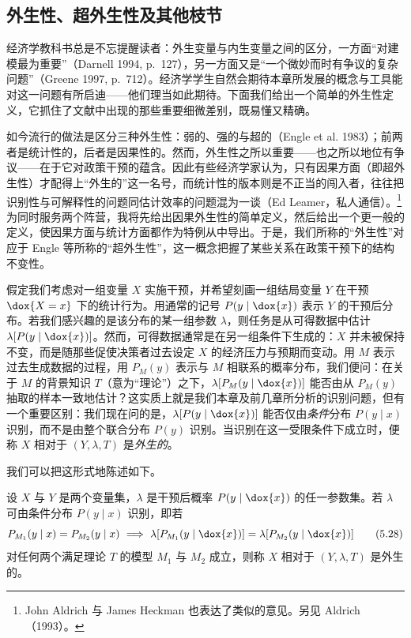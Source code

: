 \subsection{外生性、超外生性及其他枝节}

经济学教科书总是不忘提醒读者：外生变量与内生变量之间的区分，一方面“对建模最为重要”（Darnell 1994, p.~127），另一方面又是“一个微妙而时有争议的复杂问题”（Greene 1997, p.~712）。经济学学生自然会期待本章所发展的概念与工具能对这一问题有所启迪——他们理当如此期待。下面我们给出一个简单的外生性定义，它抓住了文献中出现的那些重要细微差别，既易懂又精确。

如今流行的做法是区分三种外生性：弱的、强的与超的（Engle et al. 1983）；前两者是统计性的，后者是因果性的。然而，外生性之所以重要——也之所以地位有争议——在于它对政策干预的蕴含。因此有些经济学家认为，只有因果方面（即超外生性）才配得上“外生的”这一名号，而统计性的版本则是不正当的闯入者，往往把识别性与可解释性的问题同估计效率的问题混为一谈（Ed Leamer，私人通信）。\footnote{John Aldrich 与 James Heckman 也表达了类似的意见。另见 Aldrich（1993）。}为同时服务两个阵营，我将先给出因果外生性的简单定义，然后给出一个更一般的定义，使因果方面与统计方面都作为特例从中导出。于是，我们所称的“外生性”对应于 Engle 等所称的“超外生性”，这一概念把握了某些关系在政策干预下的结构不变性。

假定我们考虑对一组变量 $X$ 实施干预，并希望刻画一组结局变量 $Y$ 在干预 $\dox{X=x}$ 下的统计行为。用通常的记号 $P(y\mid \dox{x})$ 表示 $Y$ 的干预后分布。若我们感兴趣的是该分布的某一组参数 $\lambda$，则任务是从可得数据中估计 $\lambda[P(y\mid \dox{x})]$。然而，可得数据通常是在另一组条件下生成的：$X$ 并未被保持不变，而是随那些促使决策者过去设定 $X$ 的经济压力与预期而变动。用 $M$ 表示过去生成数据的过程，用 $P_M(y)$ 表示与 $M$ 相联系的概率分布，我们便问：在关于 $M$ 的背景知识 $T$（意为“理论”）之下，$\lambda[P_M(y\mid \dox{x})]$ 能否由从 $P_M(y)$ 抽取的样本一致地估计？这实质上就是我们本章及前几章所分析的识别问题，但有一个重要区别：我们现在问的是，$\lambda[P(y\mid \dox{x})]$ 能否仅由\emph{条件}分布 $P(y\mid x)$ 识别，而不是由整个联合分布 $P(y)$ 识别。当识别在这一受限条件下成立时，便称 $X$ 相对于 $(Y,\lambda,T)$ 是\emph{外生的}。

我们可以把这形式地陈述如下。

\begin{definition}[外生性]
设 $X$ 与 $Y$ 是两个变量集，$\lambda$ 是干预后概率 $P(y\mid \dox{x})$ 的任一参数集。若 $\lambda$ 可由条件分布 $P(y\mid x)$ 识别，即若
\begin{equation}
P_{M_1}(y\mid x)=P_{M_2}(y\mid x)\ \Longrightarrow\ \lambda[P_{M_1}(y\mid \dox{x})]=\lambda[P_{M_2}(y\mid \dox{x})] \tag{5.28}
\end{equation}
对任何两个满足理论 $T$ 的模型 $M_1$ 与 $M_2$ 成立，则称 $X$ 相对于 $(Y,\lambda,T)$ 是外生的。
\end{definition}

